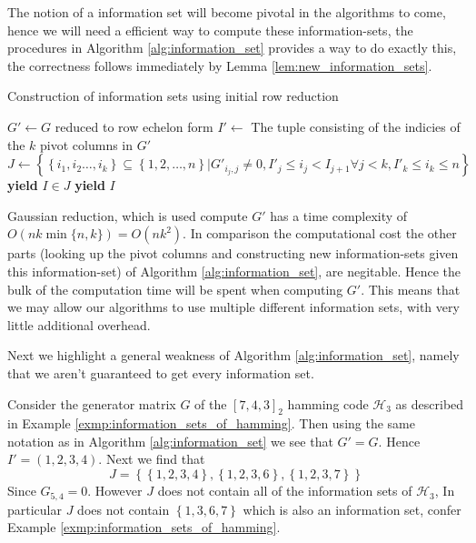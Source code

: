 The notion of a information set will become pivotal in the algorithms to come, hence we will need a efficient way to compute these information-sets, the procedures in Algorithm \ref{alg:information_set} provides a way to do exactly this, the correctness follows immediately by Lemma \ref{lem:new_information_sets}.
\begin{algorithm}[H]
\caption{Construction of information sets using initial row reduction}\label{alg:information_set}
\begin{algorithmic}
  \State $G' \gets G$ reduced to row echelon form
  \State $I' \gets$ The tuple consisting of the indicies of the $k$ pivot columns in $G'$
  \State $J \gets \left\{\left\{i_1, i_2 \ldots, i_{k}\right\} \subseteq \left\{1, 2, \ldots, n\right\}| G'_{i_{j},j} \neq 0, I'_{j} \leq i_{j} < I_{j + 1} \forall j < k, I'_{k} \leq i_k \leq n \right\}$
   \Loop
     \State \textbf{yield} $I \in J$ 
   \EndLoop
  \Else
     \State \textbf{yield} $I$ 
  \EndFor
  \EndIf
  \EndProcedure
\end{algorithmic}
\end{algorithm}
\begin{remark}\label{rem:information_set_alg}
  Gaussian reduction, which is used compute $G'$ has a time complexity of $O(nk\min\{n, k\}) = O(nk^{2})$. In comparison the computational cost the other parts (looking up the pivot columns and constructing new information-sets given this information-set) of Algorithm \ref{alg:information_set}, are negitable. Hence the bulk of the computation time will be spent when computing $G'$. This means that we may allow our algorithms to use multiple different information sets, with very little additional overhead.
\end{remark}
Next we highlight a general weakness of Algorithm \ref{alg:information_set}, namely that we aren't guaranteed to get every information set.
\begin{example}\label{exmp:first_IS_algorithm}
  Consider the generator matrix $G$ of the $[7, 4, 3]_2$ hamming code $\mathcal{H}_3$ as described in Example \ref{exmp:information_sets_of_hamming}. Then using the same notation as in Algorithm \ref{alg:information_set} we see that $G' = G$. Hence $I' = (1, 2, 3, 4)$. Next we find that
  \begin{equation*}
    J = \left\{\left\{1, 2, 3, 4\right\}, \left\{1, 2, 3, 6\right\}, \left\{1, 2, 3, 7\right\}\right\}
  \end{equation*}
  Since $G_{5, 4} = 0$. However $J$ does not contain all of the information sets of $\mathcal{H}_3$, In particular $J$ does not contain $\left\{1, 3, 6, 7\right\}$ which is also an information set, confer Example \ref{exmp:information_sets_of_hamming}.
\end{example}

